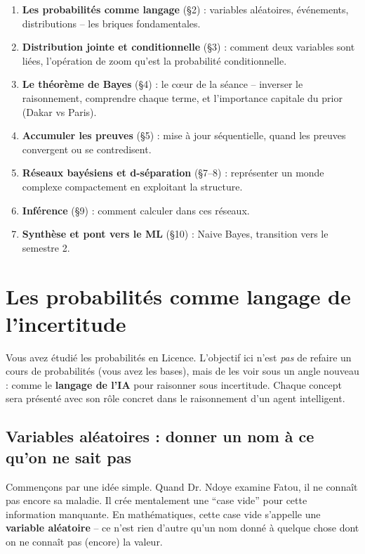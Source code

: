 \documentclass[11pt,a4paper]{article}
\begin{document}
\begin{enumerate}
    \item \textbf{Les probabilités comme langage} (§2) : variables aléatoires, événements, distributions -- les briques fondamentales.
    \item \textbf{Distribution jointe et conditionnelle} (§3) : comment deux variables sont liées, l'opération de zoom qu'est la probabilité conditionnelle.
    \item \textbf{Le théorème de Bayes} (§4) : le cœur de la séance -- inverser le raisonnement, comprendre chaque terme, et l'importance capitale du prior (Dakar vs Paris).
    \item \textbf{Accumuler les preuves} (§5) : mise à jour séquentielle, quand les preuves convergent ou se contredisent.
    \item \textbf{Réseaux bayésiens et d-séparation} (§7--8) : représenter un monde complexe compactement en exploitant la structure.
    \item \textbf{Inférence} (§9) : comment calculer dans ces réseaux.
    \item \textbf{Synthèse et pont vers le ML} (§10) : Naive Bayes, transition vers le semestre 2.
\end{enumerate}

\section{Les probabilités comme langage de l'incertitude}

Vous avez étudié les probabilités en Licence. L'objectif ici n'est \textit{pas} de refaire un cours de probabilités (vous avez les bases), mais de les voir sous un angle nouveau : comme le \textbf{langage de l'IA} pour raisonner sous incertitude. Chaque concept sera présenté avec son rôle concret dans le raisonnement d'un agent intelligent.

\subsection{Variables aléatoires : donner un nom à ce qu'on ne sait pas}

Commençons par une idée simple. Quand Dr. Ndoye examine Fatou, il ne connaît pas encore sa maladie. Il crée mentalement une ``case vide'' pour cette information manquante. En mathématiques, cette case vide s'appelle une \textbf{variable aléatoire} -- ce n'est rien d'autre qu'un nom donné à quelque chose dont on ne connaît pas (encore) la valeur.
\end{document}
